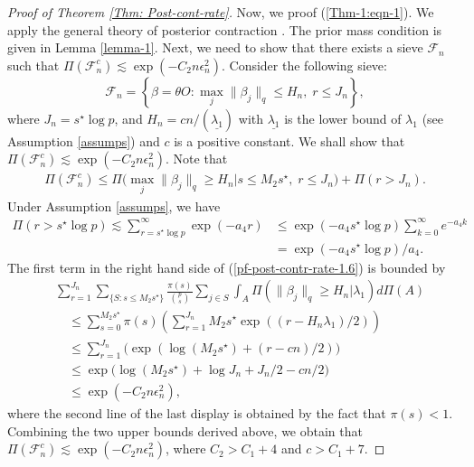 \documentclass[pdftex, noinfoline, letter]{imsart}
\theoremstyle{plain}
\begin{document}
\begin{proof}[Proof of Theorem \ref{Thm: Post-cont-rate}]
Now, we proof (\ref{Thm-1:eqn-1}). 
We apply the general theory of posterior contraction \citep{ghosal17}.
The prior mass condition is given in Lemma \ref{lemma-1}.
Next, we need to show that there exists a sieve $\mathcal{F}_n$ such that $\Pi(\mathcal{F}^c_n) \lesssim \exp(-C_2n\epsilon_n^2)$. Consider the following sieve:
$$
\mathcal{F}_n = \left\{\beta = \theta O: \max_j \|\beta_j\|_{q} \leq H_n,\; r \leq J_n\right\},
$$
where $J_n = s^\star \log p$, and $H_n = c n/\left(\underline{\lambda_1}\right)$ with $\underline{\lambda_1}$ is the lower bound of $\lambda_1$ (see Assumption \ref{assumps}) and $c$ is a positive constant.
We shall show that $\Pi(\mathcal{F}_n^c) \lesssim \exp(-C_2 n\epsilon_n^2)$.
Note that
\begin{align}
\label{pf-post-contr-rate-1.6}
\Pi(\mathcal{F}_n^c) \leq 
\Pi\Big(\max_j\|\beta_j\|_q \geq H_n| s \leq M_2s^\star,\; r \leq J_n\Big) + \Pi(r > J_n).
\end{align}
Under Assumption \ref{assumps}, 
we have
\begin{align*}
    \Pi(r > s^\star \log p)
    \lesssim \sum_{r = s^\star \log p}^{\infty} 
    \exp(- a_4 r)
    &\leq \exp(- a_4 s^\star \log p) \sum_{k = 0}^\infty e^{- a_4 k}\\
    &= \exp(- a_4 s^\star \log p)/a_4.
\end{align*}
The first term in the right hand side of (\ref{pf-post-contr-rate-1.6}) is bounded by
\begin{align*}
& \sum_{r = 1}^{J_n}
\sum_{\{S: s \leq M_2s^\star\}} 
   \frac{\pi(s)}{{p \choose s}} 
   \sum_{j \in S} \int_A \Pi(\|\beta_j\|_q \geq H_n|\lambda_1) d\Pi(A) \\
   &\quad \leq 
    \sum_{s = 0}^{M_2s^\star} \pi(s)
    \left(
   \sum_{r = 1}^{J_n}
    M_2s^\star \exp((r - H_n\lambda_1)/2)
   \right)\\
   & \quad \leq
   \sum_{r = 1}^{J_n}
   \Big(
   \exp(\log(M_2s^\star) + (r - cn)/2)
   \Big)\\
   & \quad \leq 
   \exp\Big(\log(M_2s^\star) + \log J_n + J_n/2 - cn/2\Big)\\
 & \quad \leq \exp(- C_2 n \epsilon_n^2),
\end{align*}
where the second line of the last display is obtained by the fact that $\pi(s) < 1$.
Combining the two upper bounds derived above, we obtain that 
$\Pi(\mathcal{F}_n^c) \lesssim \exp(-C_2 n \epsilon_n^2)$,
where $C_2 > C_1 + 4$ and $c > C_1 + 7$.


\end{proof}
\end{document}
